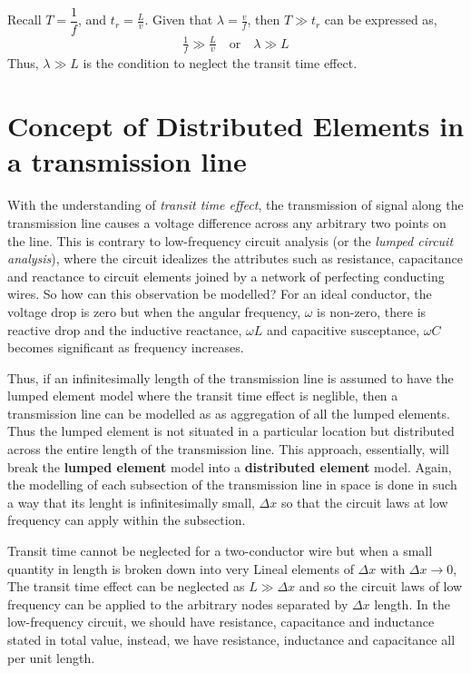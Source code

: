 Recall $T = \dfrac{1}{f} $, and $t_{r} = \frac{L}{v}$. Given that $ \lambda = \frac{v}{f} $, then $T \gg t_r$ can be expressed as, 
\begin{align*}
\frac{1}{f} \gg \frac{L}{v}\quad\text{or}\quad\lambda \gg L
\end{align*}
Thus, $ \lambda \gg L $ is the condition to neglect the transit time effect.

\section{Concept of Distributed Elements in a transmission line}
With the understanding of \textit{transit time effect}, the transmission of signal along the transmission line causes a voltage difference across any arbitrary two points on the line. This is contrary to low-frequency circuit analysis (or the \textit{lumped circuit analysis}), where the circuit idealizes the attributes such as resistance, capacitance and reactance to circuit elements joined by a network of perfecting conducting wires. So how can this observation be modelled? For an ideal conductor, the voltage drop is zero but when the angular frequency, $\omega$ is non-zero, there is reactive drop and the inductive reactance, $\omega L$ and capacitive susceptance, $\omega C$ becomes significant as frequency increases.

Thus, if an infinitesimally length of the transmission line is assumed to have the lumped element model where the transit time effect is neglible, then a transmission line can be modelled as as aggregation of all the lumped elements. Thus the lumped element is not situated in a particular location but distributed across the entire length of the transmission line. This approach, essentially, will break the \textbf{lumped element} model into a \textbf{distributed element} model. Again, the modelling of each subsection of the transmission line in space is done in such a way that its lenght is infinitesimally small, $\Delta x$ so that the circuit laws at low frequency can apply within the subsection.


Transit time cannot be neglected for a two-conductor wire but when a small quantity in length is broken down into very Lineal elements of $ \Delta x $ with  $  \Delta x \rightarrow 0 $, The transit time effect can be neglected as $ L \gg \Delta x $ and so the circuit laws of low frequency can be applied to the arbitrary nodes separated by $ \Delta x $ length. In the low-frequency circuit, we should have resistance, capacitance and inductance stated in total value, instead, we have resistance, inductance and capacitance all per unit length.

